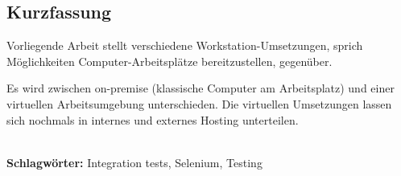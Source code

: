 
\subsection*{Kurzfassung}
Vorliegende Arbeit stellt verschiedene Workstation-Umsetzungen, sprich Möglichkeiten Computer-Arbeitsplätze bereitzustellen, gegenüber.

Es wird zwischen on-premise (klassische Computer am Arbeitsplatz) und einer virtuellen Arbeitsumgebung unterschieden.
Die virtuellen Umsetzungen lassen sich nochmals in internes und externes Hosting unterteilen.


%
\mbox{}\\[0.5\baselineskip]\noindent
\textbf{Schlagwörter:} 
Integration tests, Selenium, Testing

